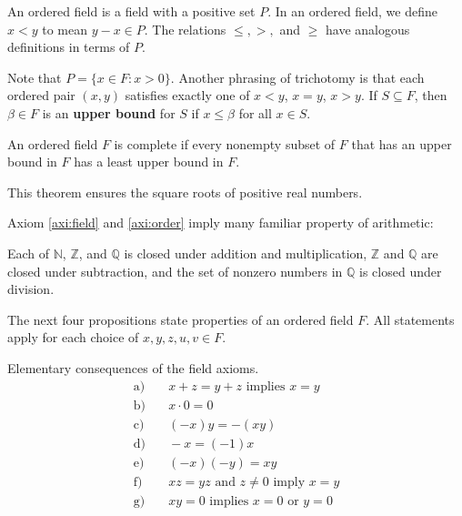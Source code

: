 \begin{enumerate}
\begin{definition}
An ordered field is a field with a positive set \( P \). In an ordered field, we define \( x < y \) to mean \( y - x \in P \). The relations \( \leq, >, \) and \( \geq \) have analogous definitions in terms of \( P \).

Note that \( P = \{ x \in F : x > 0\} \). Another phrasing of trichotomy is that each ordered pair \( (x, y) \) satisfies exactly one of \( x < y \), \( x = y \), \( x > y \).
If \( S \subseteq F \), then \( \beta \in F \) is an \textbf{upper bound} for \( S \) if \( x \leq \beta \) for all \( x \in S \).
\end{definition}
\begin{definition}
     An ordered field \( F \) is complete if every nonempty subset of \( F \) that has an upper bound in \( F \) has a least upper bound in \( F \).
\end{definition}

    This theorem ensures the square roots of positive real numbers.

\end{enumerate}

Axiom \autoref{axi:field} and \autoref{axi:order} imply many familiar property of arithmetic:

\begin{proposition}
Each of $\mathbb{N}$, $\mathbb{Z}$, and $\mathbb{Q}$ is closed under addition and multiplication, $\mathbb{Z}$ and $\mathbb{Q}$ are closed under subtraction, and the set of nonzero numbers in $\mathbb{Q}$ is closed under division.
\end{proposition}

The next four propositions state properties of an ordered field $F$. All statements apply for each choice of $x, y, z, u, v \in F$.

\begin{proposition}
Elementary consequences of the field axioms.
\begin{align*}
    \text{a)} &\quad x + z = y + z \text{ implies } x = y \\
    \text{b)} &\quad x \cdot 0 = 0 \\
    \text{c)} &\quad (-x)y = -(xy) \\
    \text{d)} &\quad -x = (-1)x \\
    \text{e)} &\quad (-x)(-y) = xy \\
    \text{f)} &\quad xz = yz \text{ and } z \neq 0 \text{ imply } x = y \\
    \text{g)} &\quad xy = 0 \text{ implies } x = 0 \text{ or } y = 0
\end{align*}
\end{proposition}

